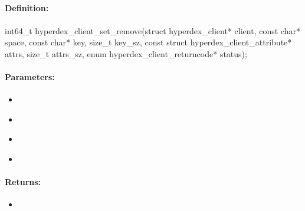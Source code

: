 \pagebreak
\subsection{}
\label{api:c:set_remove}


\paragraph{Definition:}
\begin{ccode}
int64_t hyperdex_client_set_remove(struct hyperdex_client* client,
        const char* space,
        const char* key, size_t key_sz,
        const struct hyperdex_client_attribute* attrs, size_t attrs_sz,
        enum hyperdex_client_returncode* status);
\end{ccode}

\paragraph{Parameters:}
\begin{itemize}[noitemsep]
\item {}\\

\item {}\\

\item {}\\

\item {}\\

\end{itemize}

\paragraph{Returns:}
\begin{itemize}[noitemsep]
\item {}\\

\end{itemize}

